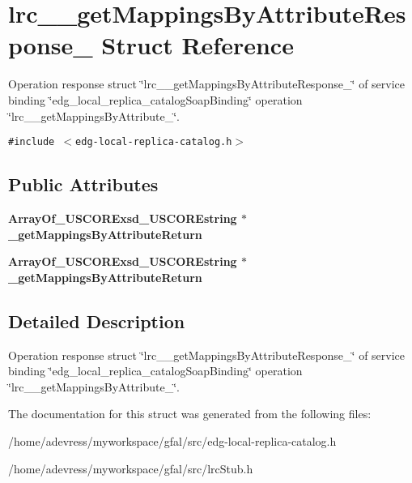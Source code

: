 \section{lrc\_\-\_\-get\-Mappings\-By\-Attribute\-Response\_\- Struct Reference}
\label{structlrc____getMappingsByAttributeResponse__}
Operation response struct \char`\"{}lrc\_\-\_\-get\-Mappings\-By\-Attribute\-Response\_\-\char`\"{} of service binding \char`\"{}edg\_\-local\_\-replica\_\-catalog\-Soap\-Binding\char`\"{} operation \char`\"{}lrc\_\-\_\-get\-Mappings\-By\-Attribute\_\-\char`\"{}.  


{\tt \#include $<$edg-local-replica-catalog.h$>$}

\subsection*{Public Attributes}
\begin{CompactItemize}
\item 
\bf{Array\-Of\_\-USCORExsd\_\-USCOREstring} $\ast$ \textbf{\_\-get\-Mappings\-By\-Attribute\-Return}\label{structlrc____getMappingsByAttributeResponse___cece62188788a37cd92687b7a7363cce}

\item 
\bf{Array\-Of\_\-USCORExsd\_\-USCOREstring} $\ast$ \textbf{\_\-get\-Mappings\-By\-Attribute\-Return}\label{structlrc____getMappingsByAttributeResponse___cece62188788a37cd92687b7a7363cce}

\end{CompactItemize}


\subsection{Detailed Description}
Operation response struct \char`\"{}lrc\_\-\_\-get\-Mappings\-By\-Attribute\-Response\_\-\char`\"{} of service binding \char`\"{}edg\_\-local\_\-replica\_\-catalog\-Soap\-Binding\char`\"{} operation \char`\"{}lrc\_\-\_\-get\-Mappings\-By\-Attribute\_\-\char`\"{}. 



The documentation for this struct was generated from the following files:\begin{CompactItemize}
\item 
/home/adevress/myworkspace/gfal/src/edg-local-replica-catalog.h\item 
/home/adevress/myworkspace/gfal/src/lrc\-Stub.h\end{CompactItemize}
